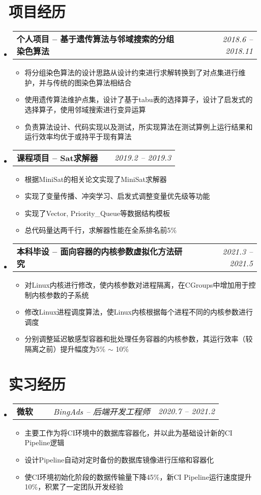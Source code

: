 \documentclass[utf8,letterpaper,11pt]{ctexart}
\makeatletter
\newcommand{\resumeOneItem}[1]{
  \item\small{
    {#1 \vspace{-2pt}}
  }
}
\newcommand{\resumeSubheading}[4]{
  \vspace{-1pt}\item
    \begin{tabular*}{0.97\textwidth}[t]{l@{\extracolsep{\fill}}r}
      \textbf{#1} & \textit{#2} \\
      \textit{\small#3} & \textit{\small #4} \\
    \end{tabular*}\vspace{-5pt}
}
\newcommand{\resumeTwoItemHeading}[2]{
  \vspace{-1pt}\item
    \begin{tabular*}{0.97\textwidth}{l@{\extracolsep{\fill}}r}
      \textbf{#1} & \textit{\small #2} \\
    \end{tabular*}\vspace{-5pt}
}
\newcommand{\resumeThreeItemHeading}[3]{
  \vspace{-1pt}\item
    \begin{tabular*}{0.97\textwidth}{ll@{\extracolsep{\fill}}r}
      \textbf{#1}\ \ \ &  \textit{\small#2} & \textit{\small #3} \\
    \end{tabular*}\vspace{-5pt}
}
\newcommand{\resumeSubHeadingListStart}{\begin{itemize}[leftmargin=*]}
\newcommand{\resumeSubHeadingListEnd}{\end{itemize}}
\newcommand{\resumeItemListStart}{\begin{itemize}}
\newcommand{\resumeItemListEnd}{\end{itemize}\vspace{-5pt}}
\makeatother
\begin{document}
\section{\faLayerGroup \ 项目经历}
\resumeSubHeadingListStart
  \resumeTwoItemHeading{个人项目 -- 基于遗传算法与邻域搜索的分组染色算法}{\href{https://github.com/copyrightpoiiiii/Hybrid-Evolutionary-Algorithms-for-the-Partition-Coloring-Problem}{\faGithub*}\ \ 2018.6 -- 2018.11}
    \resumeItemListStart
          \resumeOneItem{将分组染色算法的设计思路从设计约束进行求解转换到了对点集进行维护，并与传统的图染色算法相结合}
          \resumeOneItem{使用遗传算法维护点集，设计了基于tabu表的选择算子，设计了启发式的选择算子，使用邻域搜索进行变异运算}
          \resumeOneItem{负责算法设计、代码实现以及测试，所实现算法在测试算例上运行结果和运行效率均优于或持平于现有算法}
    \resumeItemListEnd
  \resumeTwoItemHeading{课程项目 -- Sat求解器}{\href{https://github.com/copyrightpoiiiii/Sat-and-Sudoku-Solver}{\faGithub*}\ \ 2019.2 -- 2019.3}
    \resumeItemListStart
          \resumeOneItem{根据MiniSat的相关论文实现了MiniSat求解器}
          \resumeOneItem{实现了变量传播、冲突学习、启发式调整变量优先级等功能}
          \resumeOneItem{实现了Vector, Priority\_Queue等数据结构模板}
          \resumeOneItem{总代码量达两千行，求解器性能在全系排名前5\%}
    \resumeItemListEnd
     \resumeTwoItemHeading{本科毕设 -- 面向容器的内核参数虚拟化方法研究}{2021.3 -- 2021.5}
     \resumeItemListStart
           \resumeOneItem{对Linux内核进行修改，使内核参数对进程隔离，在CGroups中增加用于控制内核参数的子系统}
           \resumeOneItem{修改Linux进程调度算法，使Linux内核根据每个进程不同的内核参数进行调度}
           \resumeOneItem{分别调整延迟敏感型容器和批处理任务容器的内核参数，其运行效率（较隔离之前）提升幅度为5\% $\sim$ 10\%}
     \resumeItemListEnd
\resumeSubHeadingListEnd
\vspace{1pt}
\section{\faBriefcase \ 实习经历}
  \resumeSubHeadingListStart
    \resumeThreeItemHeading{微软}{BingAds -- 后端开发工程师}{2020.7 -- 2021.2}
        \resumeItemListStart
        \resumeOneItem{主要工作为将CI环境中的数据库容器化，并以此为基础设计新的CI Pipeline逻辑}
        \resumeOneItem{设计Pipeline自动对定时备份的数据库镜像进行压缩和容器化}
        \resumeOneItem{使CI环境初始化阶段的数据传输量下降45\%，新CI Pipeline运行速度提升10\%，积累了一定团队开发经验}
        \resumeItemListEnd
  \resumeSubHeadingListEnd
\vspace{1pt}
\end{document}
